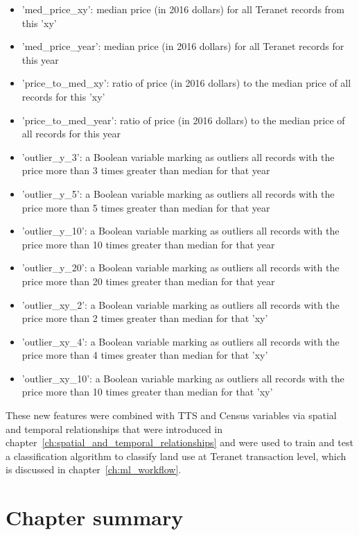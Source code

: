 \begin{itemize}
    \item 'med\_price\_xy': median price (in 2016 dollars) for all Teranet records from this 'xy'
    \item 'med\_price\_year': median price (in 2016 dollars) for all Teranet records for this year
    \item 'price\_to\_med\_xy': ratio of price (in 2016 dollars) to the median price of all records for this 'xy'
    \item 'price\_to\_med\_year': ratio of price (in 2016 dollars) to the median price of all records for this year
    \item 'outlier\_y\_3': a Boolean variable marking as outliers all records with the price more than 3 times greater than median for that year
    \item 'outlier\_y\_5': a Boolean variable marking as outliers all records with the price more than 5 times greater than median for that year
    \item 'outlier\_y\_10': a Boolean variable marking as outliers all records with the price more than 10 times greater than median for that year
    \item 'outlier\_y\_20': a Boolean variable marking as outliers all records with the price more than 20 times greater than median for that year
    \item 'outlier\_xy\_2': a Boolean variable marking as outliers all records with the price more than 2 times greater than median for that 'xy'
    \item 'outlier\_xy\_4': a Boolean variable marking as outliers all records with the price more than 4 times greater than median for that 'xy'
    \item 'outlier\_xy\_10': a Boolean variable marking as outliers all records with the price more than 10 times greater than median for that 'xy'
\end{itemize}

These new features were combined with TTS and Census variables via spatial and temporal relationships that were introduced in chapter~\ref{ch:spatial_and_temporal_relationships} and were used to train and test a classification algorithm to classify land use at Teranet transaction level, which is discussed in chapter~\ref{ch:ml_workflow}.

\section{Chapter summary} \label{sec:data_preparation_summary}

